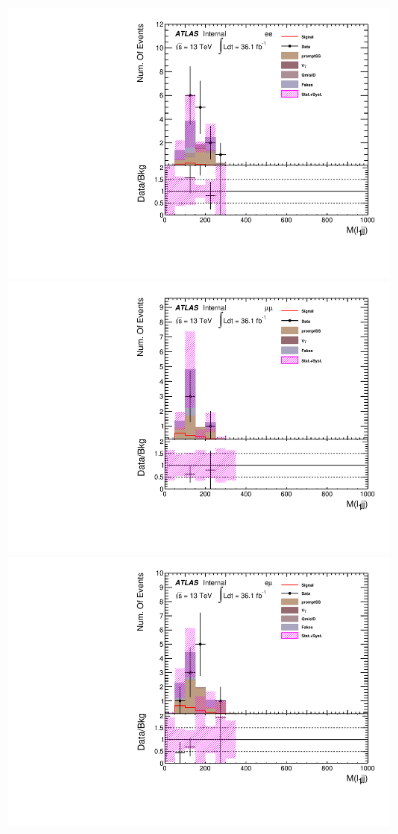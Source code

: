 \begin{figure}[h]
\begin{minipage}[t]{0.33\linewidth}
 \centering
 \includegraphics[width=0.9\textwidth,angle=-90]{fig/SigOpt/mH500_m_l1jj_ee.pdf}
 \end{minipage}
 \begin{minipage}[t]{0.33\linewidth}
 \centering
 \includegraphics[width=0.9\textwidth,angle=-90]{fig/SigOpt/mH500_m_l1jj_mumu.pdf}
 \end{minipage}
 \begin{minipage}[t]{0.33\linewidth}
 \centering
 \includegraphics[width=0.9\textwidth,angle=-90]{fig/SigOpt/mH500_m_l1jj_emu.pdf}

\end{minipage}
\end{figure}
